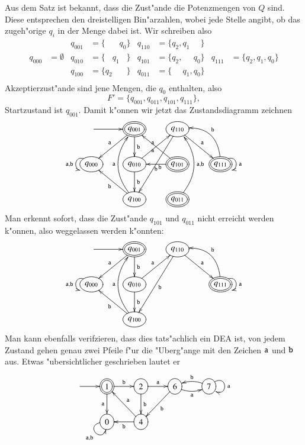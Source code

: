 Aus dem Satz ist bekannt, dass die Zust"ande die Potenzmengen von $Q$
sind. Diese entsprechen den dreistelligen Bin"arzahlen, wobei jede
Stelle angibt, ob das zugeh"orige $q_i$ in der Menge dabei ist. Wir
schreiben also
\begin{align*}
       &          &q_{001}&=\{\phantom{q_2q_1}q_0\}&q_{110}&=\{q_2,q_1\phantom{,q_0}\}&&\\
q_{000}&=\emptyset&q_{010}&=\{\phantom{q_2}q_1\phantom{q_0}\}&q_{101}&=\{q_2,\phantom{q_1,}q_0\}&q_{111}&=\{q_2,q_1,q_0\}\\
       &          &q_{100}&=\{q_2\phantom{q_1q_0}\}&q_{011}&=\{\phantom{q_2,}q_1,q_0\}&&\\
\end{align*}
Akzeptierzust"ande sind jene Mengen, die $q_0$ enthalten, also
\[
F'=\{ q_{001}, q_{011}, q_{101}, q_{111}\},
\]
Startzustand ist $q_{001}$.
Damit k"onnen wir jetzt das Zustandsdiagramm zeichnen
\[
\entrymodifiers={++[o][F]}
\xymatrix{
*+\txt{}\ar[r]
	&*++[o][F=]{q_{001}} \ar[d]^{\tt b}\ar[dl]_{\tt a}
		&{q_{110}}\ar[dr]^{\tt a} \ar[ddl]^{\tt b}
\\
{q_{000}}\ar@(ul,dl)_{{\tt a},{\tt b}}
	&{q_{010}} \ar[ur]^{\tt a} \ar[d]^{\tt b}
		&*++[o][F=]{q_{101}} \ar[ul]^{\tt a} \ar[l]^{\tt b}
			&*++[o][F=]{q_{111}}\ar@(ur,dr)^{{\tt a}} \ar@/_20pt/[ul]_{\tt b}
\\
*+\txt{}
	&{q_{100}}\ar@/^20pt/[uu]^{\tt a}  \ar[ul]^{\tt b}
		&*++[o][F=]{q_{011}} \ar@/_20pt/[uu]_{{\tt a},{\tt b}}
}
\]
Man erkennt sofort, dass die Zust"ande $q_{101}$ und $q_{011}$
nicht erreicht werden k"onnen, also weggelassen werden k"onnten:
\begin{equation}
\entrymodifiers={++[o][F]}
\xymatrix{
*+\txt{}\ar[r]
	&*++[o][F=]{q_{001}} \ar[d]^{\tt b}\ar[dl]_{\tt a}
		&{q_{110}}\ar[dr]^{\tt a} \ar[ddl]^{\tt b}
\\
{q_{000}}\ar@(ul,dl)_{{\tt a},{\tt b}}
	&{q_{010}} \ar[ur]^{\tt a} \ar[d]^{\tt b}
		&*+\txt{}
			&*++[o][F=]{q_{111}}\ar@(ur,dr)^{{\tt a}} \ar@/_20pt/[ul]_{\tt b}
\\
*+\txt{}
	&{q_{100}}\ar@/^20pt/[uu]^{\tt a}  \ar[ul]^{\tt b}
		&*+\txt{}
}
\label{nea-eps}
\end{equation}
Man kann ebenfalls verifzieren, dass dies tats"achlich ein DEA ist, 
von jedem Zustand gehen genau zwei Pfeile f"ur die "Uberg"ange mit
den Zeichen ${\tt a}$ und ${\tt b}$ aus. Etwas "ubersichtlicher
geschrieben lautet er
\[
\entrymodifiers={++[o][F]}
\xymatrix{
*+\txt{}\ar[r]
	&*++[o][F=]{1}\ar[r]^{\tt b} \ar[d]_{\tt a}
		&2 \ar[r]^{\tt a} \ar[d]^{\tt b}
			&6\ar@/_/[r]_{\tt a} \ar[dl]^{\tt b}
				&7\ar@/_/[l]_{\tt b} \ar@(ur,dr)^{\tt a}
\\
*+\txt{}
	&0 \ar@(l,d)_{{\tt a},{\tt b}}
		&4 \ar[ul]_{\tt a} \ar[l]^{\tt b}
}
\]

